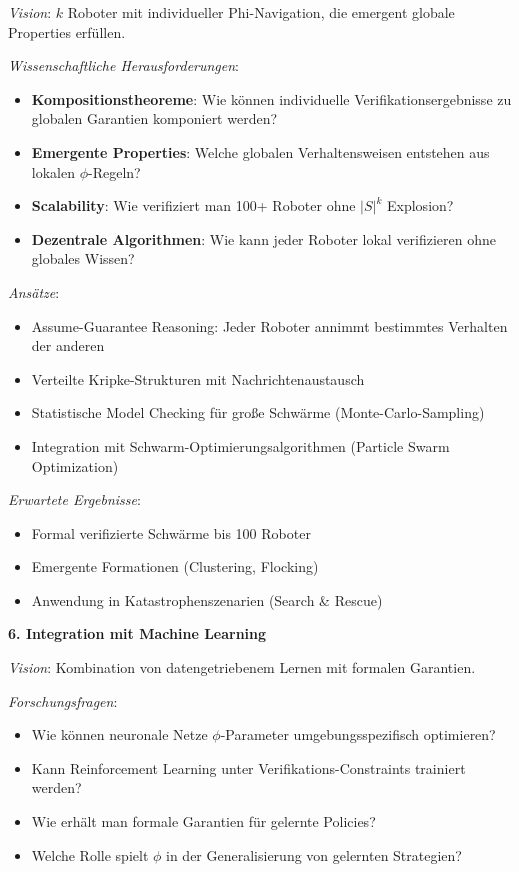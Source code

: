 ﻿\documentclass[a4paper,12pt]{article}
\theoremstyle{definition}
\begin{document}
\textit{Vision}: $k$ Roboter mit individueller Phi-Navigation, die emergent globale Properties erfüllen.

\textit{Wissenschaftliche Herausforderungen}:
\begin{itemize}
	\item \textbf{Kompositionstheoreme}: Wie können individuelle Verifikationsergebnisse zu globalen Garantien komponiert werden?
	\item \textbf{Emergente Properties}: Welche globalen Verhaltensweisen entstehen aus lokalen $\phi$-Regeln?
	\item \textbf{Scalability}: Wie verifiziert man 100+ Roboter ohne $|S|^k$ Explosion?
	\item \textbf{Dezentrale Algorithmen}: Wie kann jeder Roboter lokal verifizieren ohne globales Wissen?
\end{itemize}

\textit{Ansätze}:
\begin{itemize}
	\item Assume-Guarantee Reasoning: Jeder Roboter annimmt bestimmtes Verhalten der anderen
	\item Verteilte Kripke-Strukturen mit Nachrichtenaustausch
	\item Statistische Model Checking für große Schwärme (Monte-Carlo-Sampling)
	\item Integration mit Schwarm-Optimierungsalgorithmen (Particle Swarm Optimization)
\end{itemize}

\textit{Erwartete Ergebnisse}:
\begin{itemize}
	\item Formal verifizierte Schwärme bis 100 Roboter
	\item Emergente Formationen (Clustering, Flocking)
	\item Anwendung in Katastrophenszenarien (Search \& Rescue)
\end{itemize}

\textbf{6. Integration mit Machine Learning}

\textit{Vision}: Kombination von datengetriebenem Lernen mit formalen Garantien.

\textit{Forschungsfragen}:
\begin{itemize}
	\item Wie können neuronale Netze $\phi$-Parameter umgebungsspezifisch optimieren?
	\item Kann Reinforcement Learning unter Verifikations-Constraints trainiert werden?
	\item Wie erhält man formale Garantien für gelernte Policies?
	\item Welche Rolle spielt $\phi$ in der Generalisierung von gelernten Strategien?
\end{itemize}
\end{document}

